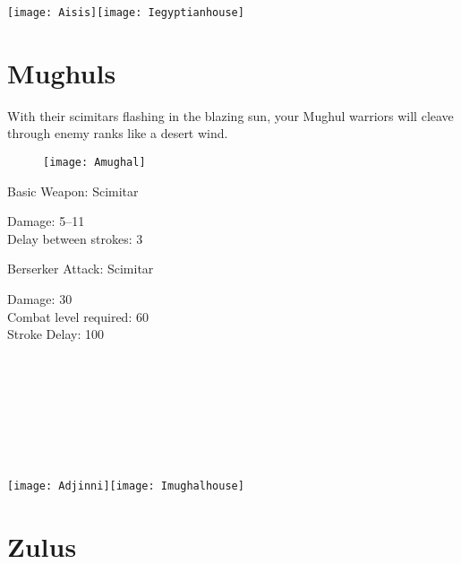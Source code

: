 \begin{center}
	\texttt{[image: Aisis]}\texttt{[image: Iegyptianhouse]}
\end{center}

\clearpage

\section{Mughuls}


With their scimitars flashing in the blazing sun, your Mughul warriors will cleave through enemy ranks like a desert wind.

\begin{wrapfigure}{r}{0.5\textwidth}
	\begin{center}
		\vspace{-20pt}
		\texttt{[image: Amughal]}
	\end{center}
	\vspace{-20pt}
\end{wrapfigure}

Basic Weapon: Scimitar
\begin{adjustwidth}{1cm}{}
	Damage: 5–11 \\
	Delay between strokes: 3
\end{adjustwidth}
Berserker Attack: Scimitar
\begin{adjustwidth}{1cm}{}
	Damage: 30 \\
	Combat level required: 60 \\
	Stroke Delay: 100 \\ \\ \\ \\ \\ \\ \\ \\ 
\end{adjustwidth}

\begin{center}
	\texttt{[image: Adjinni]}\texttt{[image: Imughalhouse]}
\end{center}

\clearpage

\section{Zulus}

